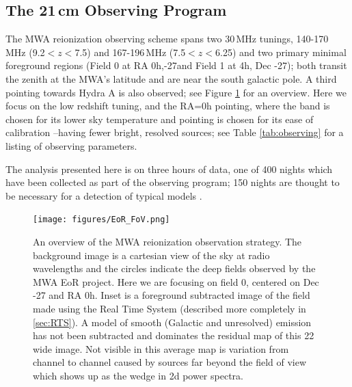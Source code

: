 \documentclass[twolcolumn,iop]{emulateapj}
\begin{document}
\subsection{The 21\,cm Observing Program}
The MWA reionization observing scheme spans two 30\,MHz tunings, 140-170\,MHz (9.2$<z<$7.5) and 167-196\,MHz (7.5$<z<$6.25) and two primary minimal foreground regions (Field 0 at RA 0h,-27\arcdeg and Field 1 at 4h, Dec -27\arcdeg); both transit the zenith at the MWA's  latitude and are near the south galactic pole. A third pointing towards Hydra A is also observed; see Figure \ref{fig:fields} for an overview. Here we focus on the low redshift tuning, and the RA=0h pointing, where the band is chosen for its lower sky temperature and pointing is chosen for its ease of calibration --having fewer bright, resolved sources; see Table \ref{tab:observing} for a listing of observing parameters.

The analysis presented here is on three hours of data, one of 400 nights which have been collected as part of the observing program; 150 nights are thought to be necessary for a detection of typical models \citep{Beardsley:2013p9952}.

\begin{figure}[htbp]
\begin{center}
\texttt{[image: figures/EoR\_FoV.png]}
\caption{An overview of the MWA reionization observation strategy. The background image is a cartesian view of the sky at radio wavelengths and the circles indicate the deep fields observed by the MWA EoR project.  Here we are focusing on field 0, centered on Dec -27\arcdeg{} and RA 0h. Inset is a foreground subtracted image of the field made using the Real Time System (described more completely in \ref{sec:RTS}). A model of smooth (Galactic and unresolved) emission has not been subtracted and dominates the residual map of this 22\arcdeg{} wide image. Not visible in this average map is variation from channel to channel caused by sources far beyond the field of view which shows up as the wedge in 2d power spectra.}
\label{fig:fields}
\end{center}
\end{figure}

\end{document}
